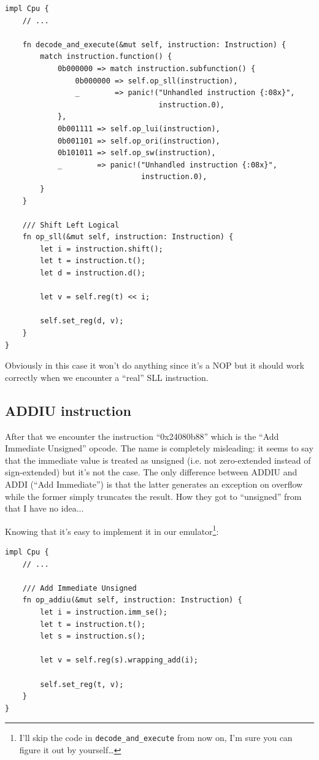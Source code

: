 \documentclass[a4paper]{article}
\newcommand{\code}[1] {\texttt{#1}}
\begin{document}
\begin{lstlisting}
impl Cpu {
    // ...

    fn decode_and_execute(&mut self, instruction: Instruction) {
        match instruction.function() {
            0b000000 => match instruction.subfunction() {
                0b000000 => self.op_sll(instruction),
                _        => panic!("Unhandled instruction {:08x}",
                                   instruction.0),
            },
            0b001111 => self.op_lui(instruction),
            0b001101 => self.op_ori(instruction),
            0b101011 => self.op_sw(instruction),
            _        => panic!("Unhandled instruction {:08x}",
                               instruction.0),
        }
    }

    /// Shift Left Logical
    fn op_sll(&mut self, instruction: Instruction) {
        let i = instruction.shift();
        let t = instruction.t();
        let d = instruction.d();

        let v = self.reg(t) << i;

        self.set_reg(d, v);
    }
}
\end{lstlisting}

Obviously in this case it won't do anything since it's a NOP but it
should work correctly when we encounter a ``real'' SLL instruction.

\subsection{ADDIU instruction}

After that we encounter the instruction ``0x24080b88'' which is the
``Add Immediate Unsigned'' opcode. The name is completely misleading: it
seems to say that the immediate value is treated as unsigned (i.e. not
zero-extended instead of sign-extended) but it's not the case. The
only difference between ADDIU and ADDI (``Add Immediate'') is that
the latter generates an exception on overflow while the former simply
truncates the result. How they got to ``unsigned'' from that I have no
idea...

Knowing that it's easy to implement it in our emulator\footnote{I'll
  skip the code in \code{decode\_and\_execute} from now on, I'm sure
  you can figure it out by yourself\dots{}}:

\begin{lstlisting}
impl Cpu {
    // ...

    /// Add Immediate Unsigned
    fn op_addiu(&mut self, instruction: Instruction) {
        let i = instruction.imm_se();
        let t = instruction.t();
        let s = instruction.s();

        let v = self.reg(s).wrapping_add(i);

        self.set_reg(t, v);
    }
}
\end{lstlisting}
\end{document}
